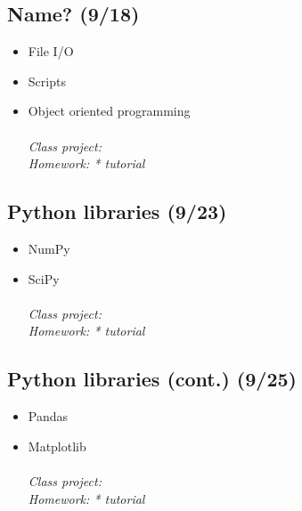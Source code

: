 \documentclass[12pt]{article}
\begin{document}
\subsection*{Name? \textnormal{\small{(9/18)} }}
\begin{itemize}
\item File I/O 
\item Scripts
\item Object oriented programming \\\\
\it{Class project: }\\
\it{Homework: * tutorial}
\end{itemize}

\subsection*{Python libraries \textnormal{\small{(9/23)} }}
\begin{itemize}
\item NumPy
\item SciPy \\\\
\it{Class project: }\\
\it{Homework: * tutorial}
\end{itemize}

\subsection*{Python libraries (cont.) \textnormal{\small{(9/25)} }}
\begin{itemize}
\item Pandas
\item Matplotlib \\\\
\it{Class project: }\\
\it{Homework: * tutorial}
\end{itemize}
\end{document}
